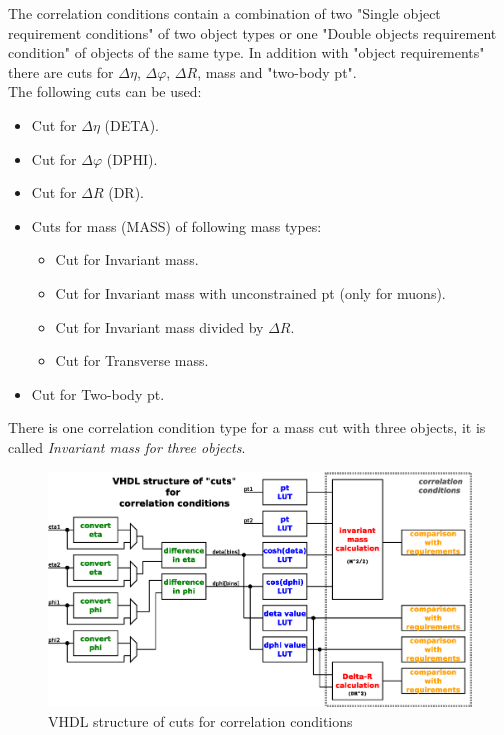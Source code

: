 The correlation conditions contain a combination of two "Single object requirement conditions" of two object types or one "Double objects requirement condition" of objects of the same type. In addition with "object requirements" there are cuts for $\Delta\eta$, $\Delta\varphi$, $\Delta$$R$, mass and "two-body pt".\\

The following cuts can be used:
\begin{itemize}
\item Cut for $\Delta\eta$ (DETA).
\item Cut for $\Delta\varphi$ (DPHI).
\item Cut for $\Delta$$R$ (DR).
\item Cuts for mass (MASS) of following mass types:
  \begin{itemize}
  \item Cut for Invariant mass.
  \item Cut for Invariant mass with unconstrained pt (only for muons).
  \item Cut for Invariant mass divided by $\Delta$$R$.
  \item Cut for Transverse mass.
  \end{itemize}
\item Cut for Two-body pt.
\end{itemize}

There is one correlation condition type for a mass cut with three objects, it is called \textit{Invariant mass for three objects}.

\begin{figure}[htb]
\centering
\includegraphics[width=15cm]{figures/scheme_vhdl_cuts_correllation_condition}
\caption{VHDL structure of cuts for correlation conditions} 
\label{fig:gtl:scheme_vhdl_cuts_correllation_condition}
\end{figure}

